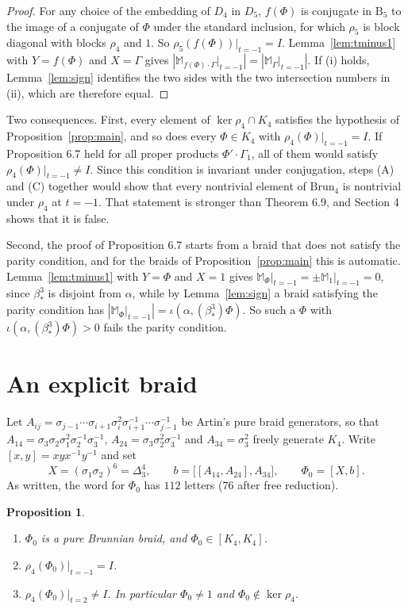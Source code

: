 \documentclass[11pt]{amsart}
\newtheorem{proposition}[lemma]{Proposition}
\theoremstyle{remark}
\newcommand{\M}{\mathbb{M}}
\newcommand{\B}{\mathrm{B}}
\newcommand{\Brun}{\mathrm{Brun}}
\newcommand{\bs}{\beta^3_*}
\newcommand{\at}{\big|_{t=-1}}
\begin{document}
\begin{proof}
For any choice of the embedding of $D_4$ in $D_5$, $f(\Phi)$ is conjugate in $\B_5$ to the image of a conjugate of $\Phi$ under the standard inclusion, for which $\rho_5$ is block diagonal with blocks $\rho_4$ and $1$. So $\rho_5(f(\Phi))\at=I$. Lemma~\ref{lem:tminus1} with $Y=f(\Phi)$ and $X=\Gamma$ gives $|\M_{f(\Phi)\cdot\Gamma}\at|=|\M_\Gamma\at|$. If (i) holds, Lemma~\ref{lem:sign} identifies the two sides with the two intersection numbers in (ii), which are therefore equal.
\end{proof}

Two consequences. First, every element of $\ker\rho_4\cap K_4$ satisfies the hypothesis of Proposition~\ref{prop:main}, and so does every $\Phi\in K_4$ with $\rho_4(\Phi)\at=I$. If Proposition 6.7 held for all proper products $\Phi'\cdot\Gamma_1$, all of them would satisfy $\rho_4(\Phi)\at\neq I$. Since this condition is invariant under conjugation, steps (A) and (C) together would show that every nontrivial element of $\Brun_4$ is nontrivial under $\rho_4$ at $t=-1$. That statement is stronger than Theorem 6.9, and Section 4 shows that it is false.

Second, the proof of Proposition 6.7 starts from a braid that does not satisfy the parity condition, and for the braids of Proposition~\ref{prop:main} this is automatic. Lemma~\ref{lem:tminus1} with $Y=\Phi$ and $X=1$ gives $\M_\Phi\at=\pm\M_1\at=0$, since $\bs$ is disjoint from $\alpha$, while by Lemma~\ref{lem:sign} a braid satisfying the parity condition has $|\M_\Phi\at|=\iota(\alpha,(\bs)\Phi)$. So such a $\Phi$ with $\iota(\alpha,(\bs)\Phi)>0$ fails the parity condition.

\section{An explicit braid}

Let $A_{ij}=\sigma_{j-1}\cdots\sigma_{i+1}\sigma_i^2\sigma_{i+1}^{-1}\cdots\sigma_{j-1}^{-1}$ be Artin's pure braid generators, so that $A_{14}=\sigma_3\sigma_2\sigma_1^2\sigma_2^{-1}\sigma_3^{-1}$, $A_{24}=\sigma_3\sigma_2^2\sigma_3^{-1}$ and $A_{34}=\sigma_3^2$ freely generate $K_4$. Write $[x,y]=xyx^{-1}y^{-1}$ and set
\[
X=(\sigma_1\sigma_2)^6=\Delta_3^4,\qquad b=\bigl[[A_{14},A_{24}],A_{34}\bigr],\qquad \Phi_0=[X,b].
\]
As written, the word for $\Phi_0$ has $112$ letters ($76$ after free reduction).

\begin{proposition}\label{prop:phi0}
\begin{enumerate}
\item[(a)] $\Phi_0$ is a pure Brunnian braid, and $\Phi_0\in[K_4,K_4]$.
\item[(b)] $\rho_4(\Phi_0)\at=I$.
\item[(c)] $\rho_4(\Phi_0)|_{t=2}\neq I$. In particular $\Phi_0\neq1$ and $\Phi_0\notin\ker\rho_4$.
\end{enumerate}
\end{proposition}
\end{document}
